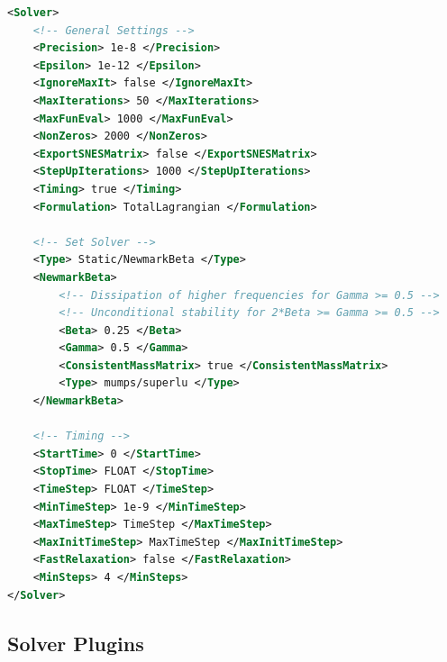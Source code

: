 \begin{lstlisting}[language=XML,caption=.xml settings for the solver class]
<Solver>
    <!-- General Settings -->
    <Precision> 1e-8 </Precision>
    <Epsilon> 1e-12 </Epsilon>
    <IgnoreMaxIt> false </IgnoreMaxIt>
    <MaxIterations> 50 </MaxIterations>
    <MaxFunEval> 1000 </MaxFunEval>
    <NonZeros> 2000 </NonZeros>
    <ExportSNESMatrix> false </ExportSNESMatrix>
    <StepUpIterations> 1000 </StepUpIterations>
    <Timing> true </Timing>
    <Formulation> TotalLagrangian </Formulation>

    <!-- Set Solver -->
    <Type> Static/NewmarkBeta </Type>
    <NewmarkBeta>
        <!-- Dissipation of higher frequencies for Gamma >= 0.5 -->
        <!-- Unconditional stability for 2*Beta >= Gamma >= 0.5 -->
        <Beta> 0.25 </Beta>
        <Gamma> 0.5 </Gamma>
        <ConsistentMassMatrix> true </ConsistentMassMatrix>
        <Type> mumps/superlu </Type>
    </NewmarkBeta>

    <!-- Timing -->
    <StartTime> 0 </StartTime>
    <StopTime> FLOAT </StopTime>
    <TimeStep> FLOAT </TimeStep>
    <MinTimeStep> 1e-9 </MinTimeStep>
    <MaxTimeStep> TimeStep </MaxTimeStep>
    <MaxInitTimeStep> MaxTimeStep </MaxInitTimeStep>
    <FastRelaxation> false </FastRelaxation>
    <MinSteps> 4 </MinSteps>
</Solver>
\end{lstlisting}

\subsection{Solver Plugins}
\label{settings:Plugins}

